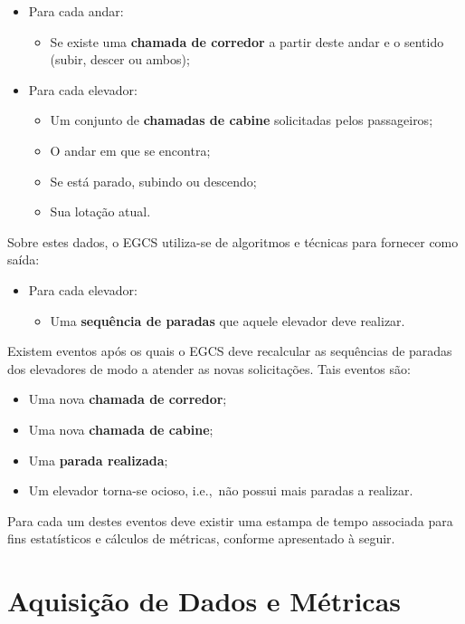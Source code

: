\begin{itemize}
  \item Para cada andar:
  \begin{itemize}
    \item Se existe uma \textbf{chamada de corredor} a partir deste andar e o
          sentido (subir, descer ou ambos);
  \end{itemize}
  \item Para cada elevador:
  \begin{itemize}
    \item Um conjunto de \textbf{chamadas de cabine} solicitadas pelos
          passageiros;
    \item O andar em que se encontra;
    \item Se está parado, subindo ou descendo;
    \item Sua lotação atual.
  \end{itemize}
\end{itemize}

Sobre estes dados, o EGCS utiliza-se de algoritmos e técnicas para fornecer como
saída:

\begin{itemize}
  \item Para cada elevador:
  \begin{itemize}
    \item Uma \textbf{sequência de paradas} que aquele elevador deve realizar.
  \end{itemize}
\end{itemize}

Existem eventos após os quais o EGCS deve recalcular as sequências de paradas
dos elevadores de modo a atender as novas solicitações. Tais eventos são:

\begin{itemize}
  \item Uma nova \textbf{chamada de corredor};
  \item Uma nova \textbf{chamada de cabine};
  \item Uma \textbf{parada realizada};
  \item Um elevador torna-se ocioso, i.e.,~não possui mais paradas a realizar.
\end{itemize}

Para cada um destes eventos deve existir uma estampa de tempo associada para
fins estatísticos e cálculos de métricas, conforme apresentado à seguir.

\section{\label{section:data}Aquisição de Dados e Métricas}

